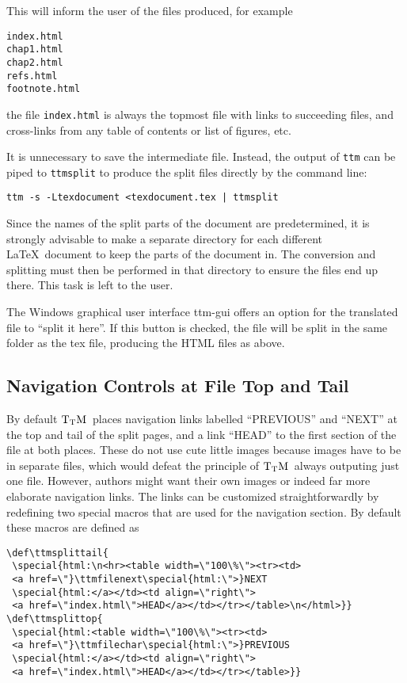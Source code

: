 \documentclass[12pt]{article}
\def\TtM{$\rm{}T_TH$}
\def\TtM{$\rm{}T_TM$}%
\begin{document}
\noindent This will inform the user of the files produced, for
example

\begin{verbatim}
index.html
chap1.html
chap2.html
refs.html
footnote.html
\end{verbatim}

\noindent the file \verb!index.html! is always the topmost file with
links to succeeding files, and cross-links from any table of contents
or list of figures, etc. 

It is unnecessary to save the intermediate file. Instead, the output
of \verb!ttm! can be piped to \verb!ttmsplit! to produce the split
files directly by the command line:

\begin{verbatim}
ttm -s -Ltexdocument <texdocument.tex | ttmsplit
\end{verbatim}

Since the names of the split parts of the document are predetermined,
it is strongly advisable to make a separate directory for each
different \LaTeX\ document to keep the parts of the document in. The
conversion and splitting must then be performed in that directory to
ensure the files end up there. This task is left to the user.

The Windows graphical user interface ttm-gui offers an option for
the translated file to ``split it here''. If this button is checked,
the file will be split in the same folder as the tex file, producing
the HTML files as above.

\subsection{Navigation Controls at File Top and Tail}

By default \TtM\ places navigation links labelled ``PREVIOUS'' and
``NEXT'' at the top and tail of the split pages, and a link ``HEAD''
to the first section of the file at both places. These do not use cute
little images because images have to be in separate files, which would
defeat the principle of \TtM\ always outputing just one file. However,
authors might want their own images or indeed far more elaborate
navigation links. The links can be customized straightforwardly by
redefining two special macros that are used for the navigation
section. By default these macros are defined as
\begin{verbatim}
\def\ttmsplittail{
 \special{html:\n<hr><table width=\"100\%\"><tr><td>
 <a href=\"}\ttmfilenext\special{html:\">}NEXT
 \special{html:</a></td><td align=\"right\">
 <a href=\"index.html\">HEAD</a></td></tr></table>\n</html>}}
\def\ttmsplittop{
 \special{html:<table width=\"100\%\"><tr><td>
 <a href=\"}\ttmfilechar\special{html:\">}PREVIOUS
 \special{html:</a></td><td align=\"right\">
 <a href=\"index.html\">HEAD</a></td></tr></table>}}
\end{verbatim}
\end{document}
